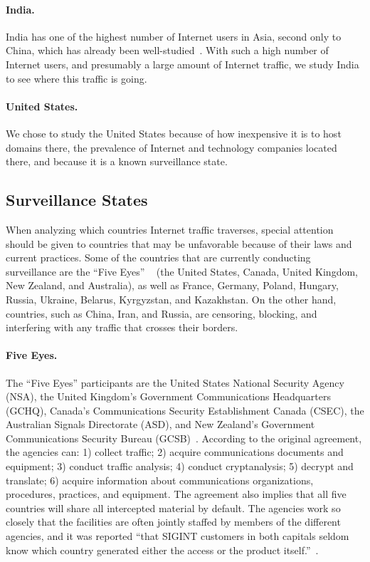 \paragraph{India.}  India has one of the highest number of Internet users in Asia, second only to China, which has already been well-studied~\cite{tsui2003panopticon, wang2010discourse}.  With such a high number of Internet users, and presumably a large amount of Internet traffic, we study India to see where this traffic is going.

\paragraph{United States.}  We chose to study the United States because of how inexpensive it is to host domains there, the prevalence of Internet and technology companies located there, and because it is a known surveillance state.

\subsection{Surveillance States}

When analyzing which countries Internet traffic traverses, special attention should be given to countries that may be unfavorable because of their laws and current practices.  Some of the countries that are currently conducting surveillance are the ``Five Eyes'' ~\cite{lander2004international, eyeswideopen} (the United States, Canada, United Kingdom, New Zealand, and Australia), as well as France, Germany, Poland, Hungary, Russia, Ukraine, Belarus, Kyrgyzstan, and Kazakhstan.  On the other hand, countries, such as China, Iran, and Russia, are censoring, blocking, and interfering with any traffic that crosses their borders.

\paragraph{Five Eyes.} The ``Five Eyes'' participants are the United States National Security Agency (NSA), the United Kingdom's Government Communications Headquarters (GCHQ), Canada's Communications Security Establishment Canada (CSEC), the Australian Signals Directorate (ASD), and New Zealand's Government Communications Security Bureau (GCSB)~\cite{eyeswideopen}.  According to the original agreement, the agencies can: 1) collect traffic; 2) acquire communications documents and equipment; 3) conduct traffic analysis; 4) conduct cryptanalysis; 5) decrypt and translate; 6) acquire information about communications organizations, procedures, practices, and equipment.  The agreement also implies that all five countries will share all intercepted material by default.  The agencies work so closely that the facilities are often jointly staffed by members of the different agencies, and it was reported ``that SIGINT customers in both capitals seldom know which country generated either the access or the product itself.''~\cite{lander2004international}.

